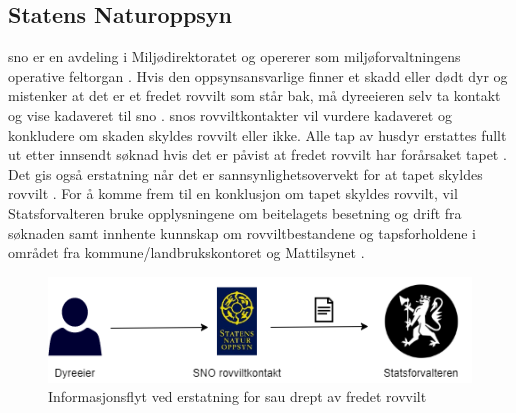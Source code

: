 \subsection{Statens Naturoppsyn}
\acrfull{sno} er en avdeling i Miljødirektoratet og opererer som miljøforvaltningens operative feltorgan \cite{KjrstadStatensSNO}.
Hvis den oppsynsansvarlige finner et skadd eller dødt dyr og mistenker at det er et fredet rovvilt som står bak, må dyreeieren selv ta kontakt og vise kadaveret til \acrshort{sno} \cite[~s.18]{StatsforvaltereniInnlandet2020InformasjonInnlandet}. \acrshort{sno}s rovviltkontakter vil vurdere kadaveret og konkludere om skaden skyldes rovvilt eller ikke. Alle tap av husdyr erstattes fullt ut etter innsendt søknad hvis det er påvist at fredet rovvilt har forårsaket tapet \cite[~s.18]{StatsforvaltereniInnlandet2020InformasjonInnlandet}. Det gis også erstatning når det er sannsynlighetsovervekt for at tapet skyldes rovvilt \cite[~s.18]{StatsforvaltereniInnlandet2020InformasjonInnlandet}. For å komme frem til en konklusjon om tapet skyldes rovvilt, vil Statsforvalteren bruke opplysningene om beitelagets besetning og drift fra søknaden samt innhente kunnskap om rovviltbestandene og tapsforholdene i området fra kommune/landbrukskontoret og Mattilsynet \cite[~s.18]{StatsforvaltereniInnlandet2020InformasjonInnlandet}.

\begin{figure}[H]
\centering
\captionsetup{width=.8\linewidth}
\includegraphics[width=0.9\linewidth]{Figurer/diagram/informasjonsflyt rovvilt.png}
\caption{Informasjonsflyt ved erstatning for sau drept av fredet rovvilt}
\label{fig:informasjonsflyt_rovvilt}
\end{figure}

